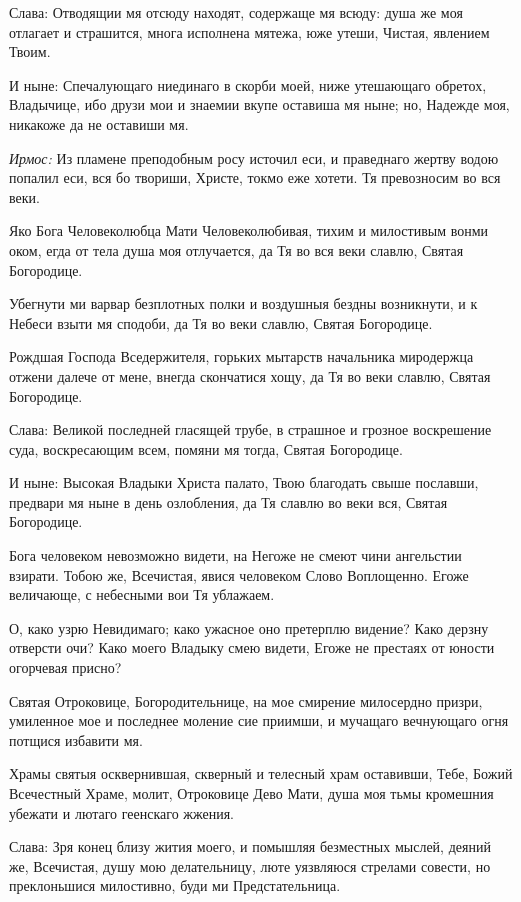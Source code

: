 \begin{mymulticols}
Слава: Отводящии мя отсюду находят, содержаще мя всюду: душа же моя отлагает и страшится, многа исполнена мятежа, юже утеши, Чистая, явлением Твоим. 

И ныне: Спечалующаго ниединаго в скорби моей, ниже утешающаго обретох, Владычице, ибо друзи мои и знаемии вкупе оставиша мя ныне; но, Надежде моя, никакоже да не оставиши мя.




{\itshape Ирмос:} Из пламене преподобным росу источил еси, и праведнаго жертву водою попалил еси, вся бо твориши, Христе, токмо еже хотети. Тя превозносим во вся веки. 

Яко Бога Человеколюбца Мати Человеколюбивая, тихим и милостивым вонми оком, егда от тела душа моя отлучается, да Тя во вся веки славлю, Святая Богородице. 

Убегнути ми варвар безплотных полки и воздушныя бездны возникнути, и к Небеси взыти мя сподоби, да Тя во веки славлю, Святая Богородице. 

Рождшая Господа Вседержителя, горьких мытарств начальника миродержца отжени далече от мене, внегда скончатися хощу, да Тя во веки славлю, Святая Богородице. 

Слава: Великой последней гласящей трубе, в страшное и грозное воскрешение суда, воскресающим всем, помяни мя тогда, Святая Богородице. 

И ныне: Высокая Владыки Христа палато, Твою благодать свыше пославши, предвари мя ныне в день озлобления, да Тя славлю во веки вся, Святая Богородице.




Бога человеком невозможно видети, на Негоже не смеют чини ангельстии взирати. Тобою же, Всечистая, явися человеком Слово Воплощенно. Егоже величающе, с небесными вои Тя ублажаем. 

О, како узрю Невидимаго; како ужасное оно претерплю видение? Како дерзну отверсти очи? Како моего Владыку смею видети, Егоже не престаях от юности огорчевая присно? 

Святая Отроковице, Богородительнице, на мое смирение милосердно призри, умиленное мое и последнее моление сие приимши, и мучащаго вечнующаго огня потщися избавити мя. 

Храмы святыя осквернившая, скверный и телесный храм оставивши, Тебе, Божий Всечестный Храме, молит, Отроковице Дево Мати, душа моя тьмы кромешния убежати и лютаго геенскаго жжения. 

Слава: Зря конец близу жития моего, и помышляя безместных мыслей, деяний же, Всечистая, душу мою делательницу, люте уязвляюся стрелами совести, но преклоньшися милостивно, буди ми Предстательница. 


\end{mymulticols}
